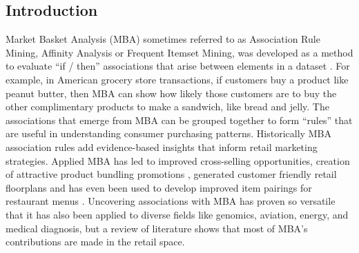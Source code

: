\documentclass[../article.tex, 12pt]{subfiles}
\begin{document}
\begin{multicols*}{2}
\section{Introduction}
\label{sec:introduction}

\thispagestyle{titlepage}

Market Basket Analysis (MBA) sometimes referred to as Association Rule Mining, Affinity Analysis or Frequent Itemset Mining, was developed as a method to evaluate ``if / then'' associations that arise between elements in a dataset \citep{agrawal1994fast}. For example, in American grocery store transactions, if customers buy a product like peanut butter, then MBA can show how likely those customers are to buy the other complimentary products to make a sandwich, like bread and jelly. The associations that emerge from MBA can be grouped together to form ``rules'' that are useful in understanding consumer purchasing patterns. Historically MBA association rules add evidence-based insights that inform retail marketing strategies. Applied MBA has led to improved cross-selling opportunities, creation of attractive product bundling promotions \citep{malati2017}, generated customer friendly retail floorplans \citep{hipp2000algorithms} and has even been used to develop improved item pairings for restaurant menus \citep{ting2010finding}. Uncovering associations with MBA has proven so versatile that it has also been applied to diverse fields like genomics, aviation, energy, and medical diagnosis, but a review of literature shows that most of MBA's contributions are made in the retail space. 


\end{multicols*}
\end{document}
